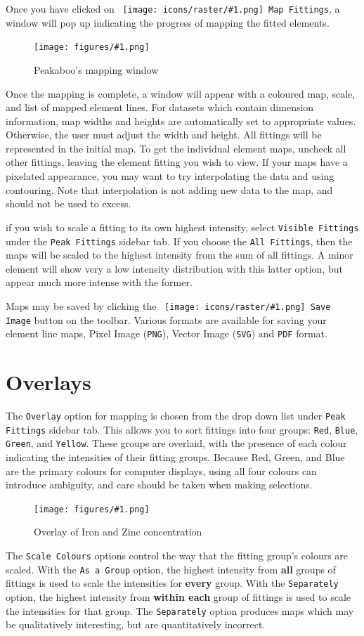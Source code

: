 \documentclass[article,twoside,11pt]{report}
\newcommand{\command}[1]{\texttt{#1}}
\newcommand{\icon}[1]{\texttt{[image: icons/raster/\#1.png]}}
\newcommand{\button}[2]{\ \command{\icon{#1} #2}}
\newcommand{\emphasis}[1]{{\bf #1}}
\newcommand{\screenshot}[2]{%
\begin{figure}[h!]
\centering\texttt{[image: figures/\#1.png]}
\caption{#2}
\end{figure}
}
\newcommand{\tocsection}[1]{\section*{#1}\addcontentsline{toc}{section}{#1}}
\begin{document}
Once you have clicked on \button{map}{Map Fittings}, a window will pop up indicating the
progress of mapping the fitted elements.

\screenshot{map-window}{Peakaboo's mapping window}

Once the mapping is complete, a window will appear with a coloured map, scale, and 
list of mapped element lines. For datasets which contain dimension information, map 
widths and heights are automatically set to appropriate values. Otherwise, the user 
must adjust the width and height. All fittings will be represented in the initial map. 
To get the individual element maps, uncheck all other fittings, leaving the element 
fitting you wish to view. If your maps have a pixelated appearance, you may want to 
try interpolating the data and using contouring. Note that interpolation is not adding 
new data to the map, and should not be used to excess.

if you wish to scale a fitting to its own highest intensity, select \command{Visible Fittings}
under the \command{Peak Fittings} sidebar tab. If you choose the 
\command{All Fittings}, then the maps will be scaled to the highest intensity from 
the sum of all fittings. A minor element will show very a low intensity 
distribution with this latter option, but appear much more intense with the former.

Maps may be saved by clicking the \button{device-camera}{Save Image} button on the toolbar.
Various formats are available for saving your element line maps, 
Pixel Image (\command{PNG}), Vector Image (\command{SVG}) and \command{PDF} format.


\tocsection{Overlays}

The \command{Overlay} option for mapping is chosen from the drop down list under 
\command{Peak Fittings} sidebar tab. This allows you to sort fittings into four groups: 
\command{Red}, \command{Blue}, \command{Green}, and \command{Yellow}. These groups are 
overlaid, with the presence of each colour indicating the intensities of their fitting 
groups. Because Red, Green, and Blue are the primary colours for computer displays, using 
all four colours can introduce ambiguity, and care should be taken when making selections.

\screenshot{map-overlay}{Overlay of Iron and Zinc concentration}

The \command{Scale Colours} options control the way that the fitting group's colours are scaled.
With the \command{As a Group} option, the highest intensity from \emphasis{all} 
groups of fittings is used to scale the intensities for \emphasis{every} group. With the 
\command{Separately} option, the highest intensity from \emphasis{within each} 
group of fittings is used to scale the intensities for that group. The \command{Separately}
option produces maps which may be qualitatively interesting, but are quantitatively 
incorrect.
\end{document}
